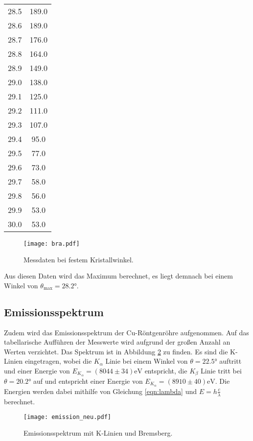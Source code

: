 \begin{table}
\begin{tabular}{c c}
      28.5	& 189.0 \\
      28.6	& 189.0 \\
      28.7	& 176.0 \\
      28.8	& 164.0 \\
      28.9	& 149.0 \\
      29.0	& 138.0 \\
      29.1	& 125.0 \\
      29.2	& 111.0 \\
      29.3	& 107.0 \\
      29.4	& 95.0\\
      29.5	& 77.0\\
      29.6	& 73.0\\
      29.7	& 58.0\\
      29.8	& 56.0\\
      29.9	& 53.0\\
      30.0	& 53.0\\
      \bottomrule
    \end{tabular}
  \end{table}

  \begin{figure}
    \centering
    \texttt{[image: bra.pdf]}
    \caption{Messdaten bei festem Kristallwinkel.}
    \label{fig:bra}
  \end{figure}

  \FloatBarrier
  \noindent Aus diesen Daten wird das Maximum berechnet, es liegt demnach bei einem Winkel von $\theta_{\text{max}} = 28.2°$. %

\subsection{Emissionsspektrum}
  Zudem wird das Emissionsspektrum der Cu-Röntgenröhre aufgenommen. Auf das tabellarische Aufführen der Messwerte wird aufgrund 
  der großen Anzahl an Werten verzichtet. Das Spektrum ist in Abbildung \ref{fig:emission} zu finden. Es sind die K-Linien eingetragen, wobei die 
  $K_{\alpha}$ Linie bei einem Winkel von $\theta = 22.5 °$ auftritt und einer Energie von $E_{K_{\alpha}} = (8044 \pm 34) \text{eV}$ entspricht,
  die $K_{\beta}$ Linie tritt bei $\theta = 20.2 °$ auf und entspricht einer Energie von $E_{K_{\alpha}} = (8910 \pm 40) \text{eV}$. Die Energien werden dabei mithilfe
  von Gleichung \eqref{eqn:lambda}
  und $E = h \frac{c}{\lambda}$ berechnet.

  \begin{figure}
    \centering
    \texttt{[image: emission\_neu.pdf]}
    \caption{Emissionsspektrum mit K-Linien und Bremsberg.}
    \label{fig:emission}
  \end{figure}

